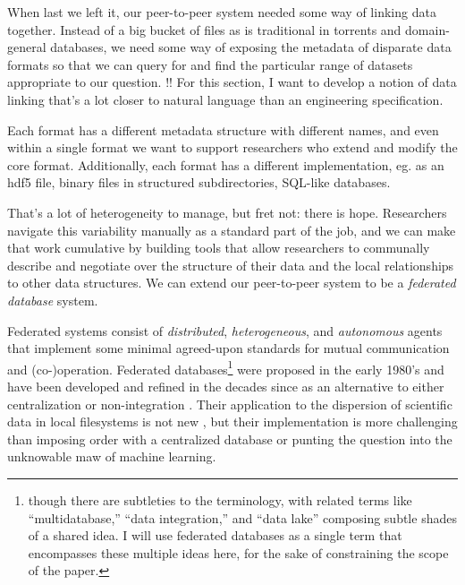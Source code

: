 \documentclass[10pt]{article}
\begin{document}
\begin{multicols}{2}
 When last we left it, our peer-to-peer system needed some
way of linking data together. Instead of a big bucket of files as is
traditional in torrents and domain-general databases, we need some way
of exposing the metadata of disparate data formats so that we can query
for and find the particular range of datasets appropriate to our
question. !! For this section, I want to develop a notion of data
linking that's a lot closer to natural language than an engineering
specification.

Each format has a different metadata structure with different names, and
even within a single format we want to support researchers who extend
and modify the core format. Additionally, each format has a different
implementation, eg. as an hdf5 file, binary files in structured
subdirectories, SQL-like databases.

That's a lot of heterogeneity to manage, but fret not: there is hope.
Researchers navigate this variability manually as a standard part of the
job, and we can make that work cumulative by building tools that allow
researchers to communally describe and negotiate over the structure of
their data and the local relationships to other data structures. We can
extend our peer-to-peer system to be a \emph{federated database} system.

Federated systems consist of \emph{distributed}, \emph{heterogeneous},
and \emph{autonomous} agents that implement some minimal agreed-upon
standards for mutual communication and (co-)operation. Federated
databases\footnote{though there are subtleties to the terminology, with
  related terms like ``multidatabase,'' ``data integration,'' and ``data
  lake'' composing subtle shades of a shared idea. I will use federated
  databases as a single term that encompasses these multiple ideas here,
  for the sake of constraining the scope of the paper.} were proposed in
the early 1980's \cite{heimbignerFederatedArchitectureInformation1985}  and have been
developed and refined in the decades since as an alternative to either
centralization or non-integration \cite{litwinInteroperabilityMultipleAutonomous1990, kashyapSemanticSchematicSimilarities1996, hullManagingSemanticHeterogeneity1997} . Their application to the
dispersion of scientific data in local filesystems is not new \cite{busseFederatedInformationSystems1999, djokic-petrovicPIBASFedSPARQLWebbased2017, hasnainBioFedFederatedQuery2017} , but their implementation is more
challenging than imposing order with a centralized database or punting
the question into the unknowable maw of machine learning.


\end{multicols}
\end{document}
